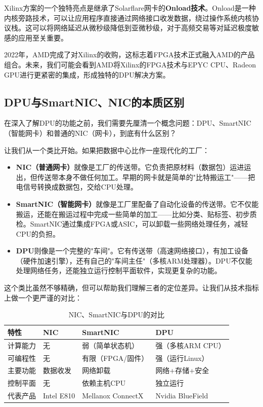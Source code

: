 Xilinx方案的一个独特亮点是继承了Solarflare网卡的\textbf{Onload技术}。Onload是一种内核旁路技术，可以让应用程序直接通过网络接口收发数据，绕过操作系统内核协议栈。这可以将网络延迟从微秒级降低到亚微秒级，对于高频交易等对延迟极度敏感的应用至关重要。

2022年，AMD完成了对Xilinx的收购，这标志着FPGA技术正式融入AMD的产品组合。未来，我们可能会看到AMD将Xilinx的FPGA技术与EPYC CPU、Radeon GPU进行更紧密的集成，形成独特的DPU解决方案。

\subsection{DPU与SmartNIC、NIC的本质区别}

在深入了解DPU的功能之前，我们需要先厘清一个概念问题：DPU、SmartNIC（智能网卡）和普通的NIC（网卡），到底有什么区别？

让我们从一个类比开始。如果把数据中心比作一座现代化的工厂：

\begin{itemize}
    \item \textbf{NIC（普通网卡）}就像是工厂的传送带。它负责把原材料（数据包）运进运出，但传送带本身不做任何加工。早期的网卡就是简单的"比特搬运工"——把电信号转换成数据包，交给CPU处理。
    \item \textbf{SmartNIC（智能网卡）}就像是工厂里配备了自动化设备的传送带。它不仅能搬运，还能在搬运过程中完成一些简单的加工——比如分类、贴标签、初步质检。SmartNIC通过集成FPGA或ASIC，可以卸载一些网络处理任务，减轻CPU的负担。
    \item \textbf{DPU}则像是一个完整的"车间"。它有传送带（高速网络接口），有加工设备（硬件加速引擎），还有自己的"车间主任"（多核ARM处理器）。DPU不仅能处理网络任务，还能独立运行控制平面软件，实现更复杂的功能。
\end{itemize}

这个类比虽然不够精确，但可以帮助我们理解三者的定位差异。让我们从技术指标上做一个更严谨的对比：

\begin{table}[htbp]
\centering
\caption{NIC、SmartNIC与DPU的对比}
\begin{tabular}{|l|p{3cm}|p{4cm}|p{4cm}|}
\hline
\textbf{特性} & \textbf{NIC} & \textbf{SmartNIC} & \textbf{DPU} \\
\hline
计算能力 & 无 & 弱（简单状态机） & 强（多核ARM CPU） \\
\hline
可编程性 & 无 & 有限（FPGA/固件） & 强（运行Linux） \\
\hline
主要功能 & 数据收发 & 网络卸载 & 网络+存储+安全 \\
\hline
控制平面 & 无 & 依赖主机CPU & 独立运行 \\
\hline
代表产品 & Intel E810 & Mellanox ConnectX & Nvidia BlueField \\
\hline
\end{tabular}
\end{table}

